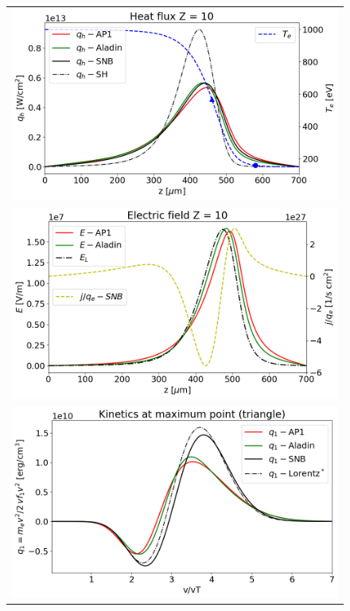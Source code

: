 \begin{figure}[htb]
  \begin{center}
    \begin{tabular}{c}
      \includegraphics[width=\figscale\textwidth]{../VFPdata/C7_Aladin_case3_heatflux.png} \\
      \includegraphics[width=\figscale\textwidth]{../VFPdata/C7_Aladin_case3_Efield.png} \\
      \includegraphics[width=\figscale\textwidth]{../VFPdata/C7_Aladin_case3_kinetics.png} \\

\end{tabular}
\end{center}
\end{figure}
